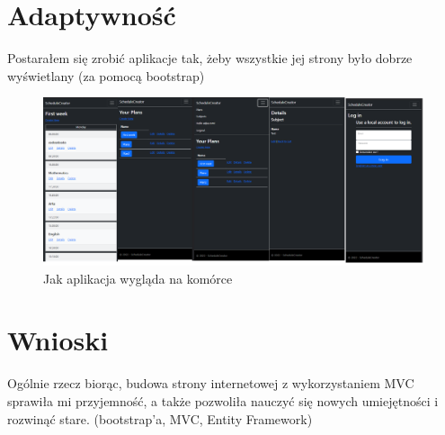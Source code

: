 \documentclass[a4paper,12pt,oneside]{book} %
\begin{document}
\chapter*{Adaptywność}

Postarałem się zrobić aplikacje tak, żeby wszystkie jej strony było dobrze wyświetlany (za pomocą bootstrap)
\begin{figure}[h]
    \centering\includegraphics[width=14cm]{mobile.png}
    \caption{Jak aplikacja wygląda na komórce}
\end{figure}

\chapter*{Wnioski}

Ogólnie rzecz biorąc, budowa strony internetowej z wykorzystaniem MVC sprawiła mi przyjemność, a także pozwoliła nauczyć się nowych umiejętności i rozwinąć stare.
(bootstrap'a, MVC, Entity Framework)

\end{document}
